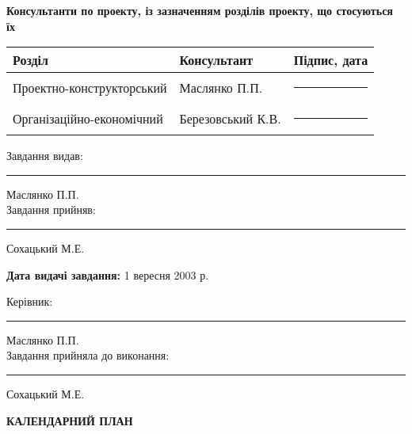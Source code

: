 \documentclass{memoir}
\begin{document}
\newpage
\begin{center}
    \textbf{Консультанти по проекту, із зазначенням розділів проекту, що стосуються їх}
\end{center}

\begin{tabular}{|>{\raggedright\arraybackslash}p{5cm}|>{\raggedright\arraybackslash}p{5cm}|>{\raggedright\arraybackslash}p{3cm}|}
    \hline
    \textbf{Розділ} & \textbf{Консультант} & \textbf{Підпис, дата} \\
    \hline
    Проектно-конструкторський & Маслянко П.П. & \rule{3cm}{0.4pt} \\
    \hline
    Організаційно-економічний & Березовський К.В. & \rule{3cm}{0.4pt} \\
    \hline
\end{tabular}

\vspace{0.5cm}

\begin{flushleft}
    Завдання видав: \rule{3cm}{0.4pt} Маслянко П.П. \\
    Завдання прийняв: \rule{3cm}{0.4pt} Сохацький М.Е.
\end{flushleft}

\vspace{0.5cm}

\begin{center}
    \textbf{Дата видачі завдання:} 1 вересня 2003 р.
\end{center}

\begin{flushleft}
    Керівник: \rule{3cm}{0.4pt} Маслянко П.П. \\
    Завдання прийняла до виконання: \rule{3cm}{0.4pt} Сохацький М.Е.
\end{flushleft}

\begin{center}
    {\large \textbf{КАЛЕНДАРНИЙ ПЛАН}}
\end{center}
\end{document}
